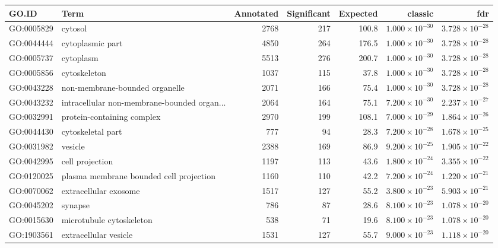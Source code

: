 \begin{table}[ht]
\centering
\begin{tabular}{llrrrrr}
  \hline
GO.ID & Term & Annotated & Significant & Expected & classic & fdr \\ 
  \hline
GO:0005829 & cytosol & 2768 & 217 & 100.8 & $1.000 \times 10^{-30}$ & $3.728 \times 10^{-28}$ \\ 
  GO:0044444 & cytoplasmic part & 4850 & 264 & 176.5 & $1.000 \times 10^{-30}$ & $3.728 \times 10^{-28}$ \\ 
  GO:0005737 & cytoplasm & 5513 & 276 & 200.7 & $1.000 \times 10^{-30}$ & $3.728 \times 10^{-28}$ \\ 
  GO:0005856 & cytoskeleton & 1037 & 115 & 37.8 & $1.000 \times 10^{-30}$ & $3.728 \times 10^{-28}$ \\ 
  GO:0043228 & non-membrane-bounded organelle & 2071 & 166 & 75.4 & $1.000 \times 10^{-30}$ & $3.728 \times 10^{-28}$ \\ 
  GO:0043232 & intracellular non-membrane-bounded organ... & 2064 & 164 & 75.1 & $7.200 \times 10^{-30}$ & $2.237 \times 10^{-27}$ \\ 
  GO:0032991 & protein-containing complex & 2970 & 199 & 108.1 & $7.000 \times 10^{-29}$ & $1.864 \times 10^{-26}$ \\ 
  GO:0044430 & cytoskeletal part & 777 & 94 & 28.3 & $7.200 \times 10^{-28}$ & $1.678 \times 10^{-25}$ \\ 
  GO:0031982 & vesicle & 2388 & 169 & 86.9 & $9.200 \times 10^{-25}$ & $1.905 \times 10^{-22}$ \\ 
  GO:0042995 & cell projection & 1197 & 113 & 43.6 & $1.800 \times 10^{-24}$ & $3.355 \times 10^{-22}$ \\ 
  GO:0120025 & plasma membrane bounded cell projection & 1160 & 110 & 42.2 & $7.200 \times 10^{-24}$ & $1.220 \times 10^{-21}$ \\ 
  GO:0070062 & extracellular exosome & 1517 & 127 & 55.2 & $3.800 \times 10^{-23}$ & $5.903 \times 10^{-21}$ \\ 
  GO:0045202 & synapse & 786 & 87 & 28.6 & $8.100 \times 10^{-23}$ & $1.078 \times 10^{-20}$ \\ 
  GO:0015630 & microtubule cytoskeleton & 538 & 71 & 19.6 & $8.100 \times 10^{-23}$ & $1.078 \times 10^{-20}$ \\ 
  GO:1903561 & extracellular vesicle & 1531 & 127 & 55.7 & $9.000 \times 10^{-23}$ & $1.118 \times 10^{-20}$ \\ 

\end{tabular}
\end{table}
